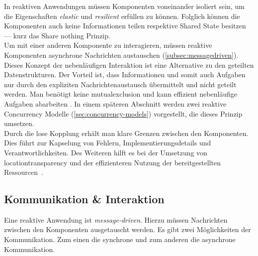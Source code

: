 \pagebreak

In reaktiven Anwendungen müssen Komponenten voneinander isoliert sein, um die Eigenschaften \textit{elastic} und \textit{resilient} erfüllen zu können. Folglich können die Komponenten auch keine Informationen teilen respektive Shared State besitzen --- kurz das Share nothing Prinzip.\\
Um mit einer anderen Komponente zu interagieren, müssen reaktive Komponenten asynchrone Nachrichten austauschen (\ref{subsec:messagedriven}).\\
Dieses Konzept der nebenläufigen Interaktion ist eine Alternative zu den geteilten Datenstrukturen. Der Vorteil ist, dass Informationen und somit auch Aufgaben nur durch den expliziten Nachrichtenaustausch übermittelt und nicht geteilt werden. Man benötigt keine \gls{mutualexclusion} und kann effizient nebenläufige Aufgaben abarbeiten \cite[S.~439]{armstrong_programming_2013}. In einem späteren Abschnitt werden zwei reaktive Concurrency Modelle (\ref{sec:concurrency-models}) vorgestellt, die dieses Prinzip umsetzen.\\

Durch die lose Kopplung erhält man klare Grenzen zwischen den Komponenten. Dies führt zur Kapselung von Fehlern, Implementierungsdetails und Verantwortlichkeiten. Des Weiteren hilft es bei der Umsetzung von \gls{locationtransparency} und der effizienteren Nutzung der bereitgestellten Ressourcen~\cite[S.~45]{kuhn_reactive_2015}.

\pagebreak

\subsection{Kommunikation \& Interaktion}\label{subsec:communication}
Eine reaktive Anwendung ist \textit{message-driven}. Hierzu müssen Nachrichten zwischen den Komponenten ausgetauscht werden. Es gibt zwei Möglichkeiten der Kommunikation. Zum einen die synchrone und zum anderen die asynchrone Kommunikation.

